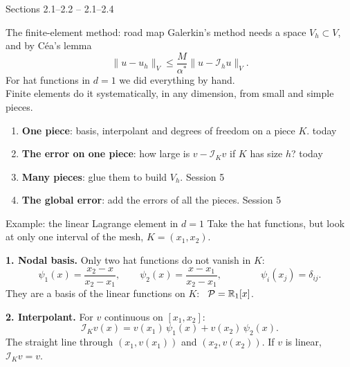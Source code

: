 
{Sections 2.1--2.2}
{--}
{2.1--2.4}

\begin{frame}{The finite-element method: road map}
    Galerkin's method needs a space $V_h \subset V$, and by Céa's lemma
    \[
        \|u - u_h\|_V \le \frac{M}{\alpha^*} \|u - \mathcal I_h u\|_V .
    \]
    For hat functions in $d=1$ we did everything by hand.\\ Finite elements do it systematically, in any dimension, from \alert{small and simple pieces}.
    \begin{enumerate}
        \item \textbf{One piece}: basis, interpolant and degrees of freedom on a piece $K$. \hfill {\color{mnuaccent}today}
        \item \textbf{The error on one piece}: how large is $v - \mathcal I_K v$ if $K$ has size $h$? \hfill {\color{mnuaccent}today}
        \item \textbf{Many pieces}: glue them to build $V_h$. \hfill Session 5
        \item \textbf{The global error}: add the errors of all the pieces. \hfill Session 5
    \end{enumerate}
\end{frame}

\begin{frame}{Example: the linear Lagrange element in $d = 1$}
    Take the hat functions, but look at only one interval of the mesh, $K = (x_1, x_2)$.
    \begin{center}
    \end{center}
    \textbf{1. Nodal basis.} Only two hat functions do not vanish in $K$:
    \[
        \psi_1(x) = \frac{x_2 - x}{x_2 - x_1}, \qquad \psi_2(x) = \frac{x - x_1}{x_2 - x_1},
        \qquad\qquad \psi_i(x_j) = \delta_{ij}.
    \]
    They are a basis of the linear functions on $K$: \ $\mathcal P = {\mathbb R}_1[x]$.
    \medskip

    \textbf{2. Interpolant.} For $v$ continuous on $[x_1, x_2]$:
    \[
        \mathcal I_K v(x) = v(x_1)\, \psi_1(x) + v(x_2)\, \psi_2(x).
    \]
    The straight line through $(x_1, v(x_1))$ and $(x_2, v(x_2))$. If $v$ is linear, $\mathcal I_K v = v$.
\end{frame}

